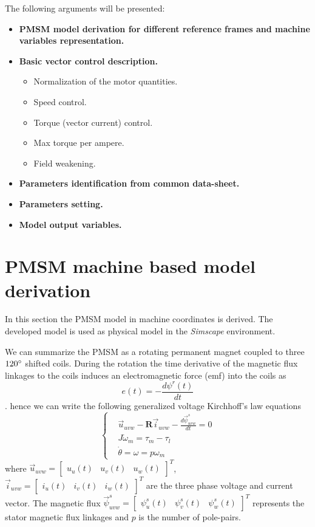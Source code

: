 \documentclass[12pt,a4paper]{scrartcl}
\begin{document}
\begin{onehalfspace}		

\noindent The following arguments will be presented:
\begin{itemize}
	\item[$-$] \textbf{PMSM model derivation for different reference frames and machine variables representation.}
	\item[$-$] \textbf{Basic vector control description.}
	\begin{itemize}
		\item[$-$] Normalization of the motor quantities.
		\item[$-$] Speed control.
		\item[$-$] Torque (vector current) control.
		\item[$-$] Max torque per ampere.
		\item[$-$] Field weakening.
	\end{itemize}
	\item[$-$] \textbf{Parameters identification from common data-sheet.}
	\item[$-$] \textbf{Parameters setting.}
	\item[$-$] \textbf{Model output variables.}
\end{itemize}


\section{PMSM machine based model derivation}
In this section the PMSM model in machine coordinates is derived. The developed model is used as physical model in the \textit{Simscape} environment.

We can summarize the PMSM as a rotating permanent magnet coupled to three $120\degree$ shifted coils. During the rotation the time derivative of the magnetic flux linkages to the coils induces an electromagnetic force (emf) into the coils as $$e(t) = -\frac{d\psi^r(t)}{dt}$$.
hence we can write the following generalized voltage Kirchhoff's law equations
\begin{equation}\label{threephase_eq1}
	\left\lbrace \begin{aligned}
		& \vec{u}_{uvw}-\mathbf{R}\vec{i}_{uvw}-\frac{d\vec{\psi}^s_{uvw}}{dt} = 0 \\[6pt]
		& J\dot{\omega}_m = \tau_m-\tau_l \\[6pt]
		& \dot{\theta} = \omega = p\omega_m
	\end{aligned} \right. 
\end{equation}
where $\vec{u}_{uvw}=\begin{bmatrix} u_u(t) &  u_v(t) & u_w(t) \end{bmatrix}^T$, $\vec{i}_{uvw}=\begin{bmatrix} i_u(t) &  i_v(t) & i_w(t) \end{bmatrix}^T$ are the three phase voltage and current vector. The magnetic flux $\vec{\psi}^s_{uvw}=\begin{bmatrix} \psi_u^s(t) &  \psi_v^s(t) & \psi_w^s(t) \end{bmatrix}^T$ represents the stator magnetic flux linkages and $p$ is the number of pole-pairs.


\end{onehalfspace}
\end{document}
